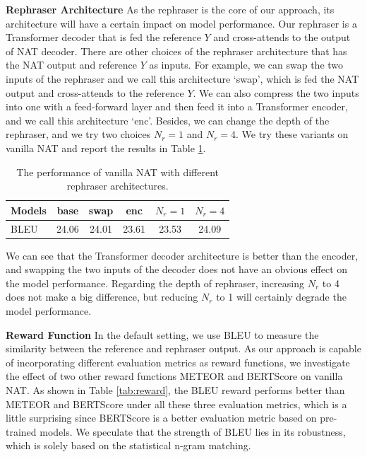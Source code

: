 \documentclass[letterpaper]{article} %
\begin{document}
\noindent{}\textbf{Rephraser Architecture} As the rephraser is the core of our approach, its architecture will have a certain impact on model performance. Our rephraser is a Transformer decoder that is fed the reference $Y$ and cross-attends to the output of NAT decoder. There are other choices of the rephraser architecture that has the NAT output and reference $Y$ as inputs. For example, we can swap the two inputs of the rephraser and we call this architecture `swap', which is fed the NAT output and cross-attends to the reference $Y$. We can also compress the two inputs into one with a feed-forward layer and then feed it into a Transformer encoder, and we call this architecture `enc'. Besides, we can change the depth of the rephraser, and we try two choices $N_r=1$ and $N_r=4$. We try these variants on vanilla NAT and report the results in Table \ref{tab:archi}.
\begin{table}[t]
\small
\centering
\begin{tabular}{lccccc}
\toprule
{\textbf{Models}} &base& swap & enc& $N_r=1$&$N_r=4$\\
\midrule
BLEU&24.06&24.01&23.61&23.53&24.09\\
\bottomrule
\end{tabular}
\caption{The performance of vanilla NAT with different rephraser architectures.}
\label{tab:archi}
\end{table}

We can see that the Transformer decoder architecture is better than the encoder, and swapping the two inputs of the decoder does not have an obvious effect on the model performance. Regarding the depth of rephraser, increasing $N_r$ to 4 does not make a big difference, but reducing $N_r$ to 1 will certainly degrade the model performance.

\noindent{}\textbf{Reward Function} In the default setting, we use BLEU to measure the similarity between the reference and rephraser output.
As our approach is capable of incorporating different evaluation metrics as reward functions, we investigate the effect of two other reward functions METEOR \cite{banerjee-lavie-2005-meteor} and BERTScore \cite{zhang2019bertscore} on vanilla NAT. As shown in Table \ref{tab:reward}, the BLEU reward performs better than METEOR and BERTScore under all these three evaluation metrics, which is a little surprising since BERTScore is a better evaluation metric based on pre-trained models. We speculate that the strength of BLEU lies in its robustness, which is solely based on the statistical n-gram matching.
\end{document}
